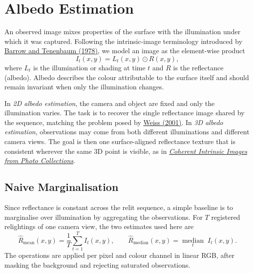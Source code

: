 \documentclass[11pt]{article}
\begin{document}
\clearpage
\section{Albedo Estimation}

An observed image mixes properties of the surface with the illumination under
which it was captured. Following the intrinsic-image terminology introduced by
\href{https://people.csail.mit.edu/torralba/courses/6.870/papers/Barrow-Tenenbaum78.pdf}{Barrow and Tenenbaum (1978)}, we model an image as the element-wise
product
\begin{equation}
  I_t(x,y) = L_t(x,y) \odot R(x,y),
  \label{eq:intrinsic-image}
\end{equation}
where $L_t$ is the illumination or shading at time $t$ and $R$ is the
reflectance (albedo). Albedo describes the colour attributable to the surface
itself and should remain invariant when only the illumination changes.

In \emph{2D albedo estimation}, the camera and object are fixed and only the
illumination varies. The task is to recover the single reflectance image shared
by the sequence, matching the problem posed by
\href{https://people.eecs.berkeley.edu/~efros/courses/AP06/Papers/weiss-iccv-01.pdf}{Weiss (2001)}. In \emph{3D albedo estimation}, observations may come from both
different illuminations and different camera views. The goal is then one
surface-aligned reflectance texture that is consistent wherever the same 3D
point is visible, as in
\href{https://people.csail.mit.edu/sparis/publi/2012/sigasia_intrinsic/Laffont_12_Coherent_Intrinsic_Images.pdf}{\emph{Coherent Intrinsic Images from Photo Collections}}.

\subsection{Naive Marginalisation}

Since reflectance is constant across the relit sequence, a simple baseline is
to marginalise over illumination by aggregating the observations. For $T$
registered relightings of one camera view, the two estimates used here are
\begin{equation}
  \widehat{R}_{\mathrm{mean}}(x,y)
    = \frac{1}{T}\sum_{t=1}^{T} I_t(x,y),
  \qquad
  \widehat{R}_{\mathrm{median}}(x,y)
    = \underset{t}{\operatorname{median}}\; I_t(x,y).
  \label{eq:naive-aggregation}
\end{equation}
The operations are applied per pixel and colour channel in linear RGB, after
masking the background and rejecting saturated observations.
\end{document}
